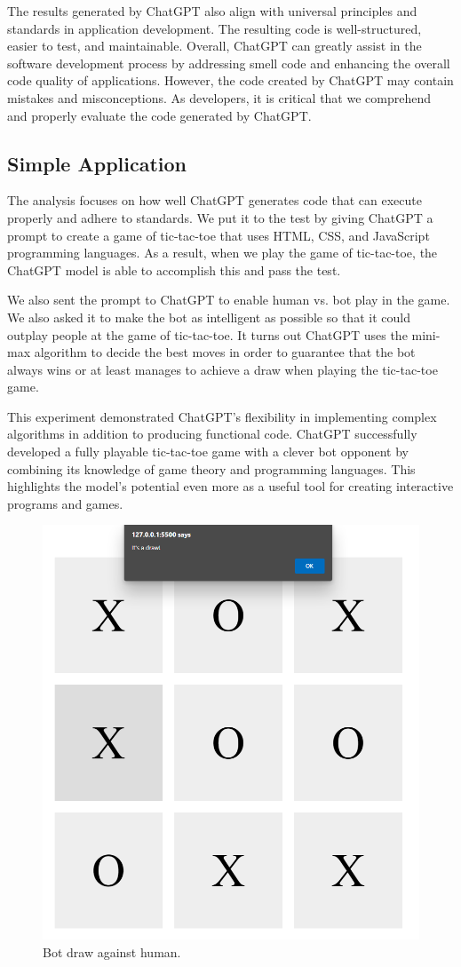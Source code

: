 \documentclass[conference]{IEEEtran}
\begin{document}
The results generated by ChatGPT also align with universal principles and standards in application development. The resulting code is well-structured, easier to test, and maintainable. Overall, ChatGPT can greatly assist in the software development process by addressing smell code and enhancing the overall code quality of applications. However, the code created by ChatGPT may contain mistakes and misconceptions. As developers, it is critical that we comprehend and properly evaluate the code generated by ChatGPT.



\subsection{Simple Application}
The analysis focuses on how well ChatGPT generates code that can execute properly and adhere to standards. We put it to the test by giving ChatGPT a prompt to create a game of tic-tac-toe that uses HTML, CSS, and JavaScript programming languages. As a result, when we play the game of tic-tac-toe, the ChatGPT model is able to accomplish this and pass the test.

We also sent the prompt to ChatGPT to enable human vs. bot play in the game. We also asked it to make the bot as intelligent as possible so that it could outplay people at the game of tic-tac-toe. It turns out ChatGPT uses the mini-max algorithm to decide the best moves in order to guarantee that the bot always wins or at least manages to achieve a draw when playing the tic-tac-toe game.

This experiment demonstrated ChatGPT's flexibility in implementing complex algorithms in addition to producing functional code. ChatGPT successfully developed a fully playable tic-tac-toe game with a clever bot opponent by combining its knowledge of game theory and programming languages. This highlights the model's potential even more as a useful tool for creating interactive programs and games.




\vspace{-5pt}

\begin{figure}[H]
\centerline{\includegraphics[width=0.3\linewidth]{Simple Application/draw.png}}
\caption{Bot draw against human.}
\label{simple app draw}
\end{figure}
\end{document}
